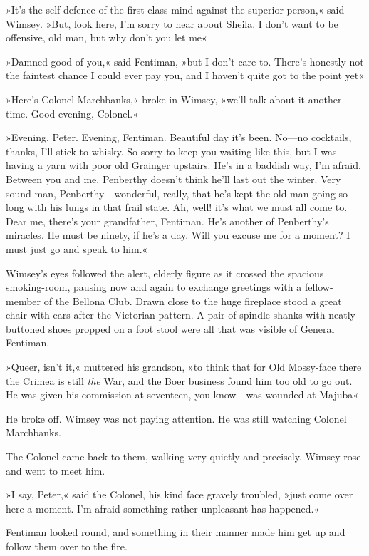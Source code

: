 »It's the self-defence of the first-class mind against the superior person,« said Wimsey. »But, look here, I'm sorry to hear about Sheila. I don't want to be offensive, old man, but why don't you let me\longdash«

»Damned good of you,« said Fentiman, »but I don't care to. There's honestly not the faintest chance I could ever pay you, and I haven't quite got to the point yet\longdash«

»Here's Colonel Marchbanks,« broke in Wimsey, »we'll talk about it another time. Good evening, Colonel.«

»Evening, Peter. Evening, Fentiman. Beautiful day it's been. No—no cocktails, thanks, I'll stick to whisky. So sorry to keep you waiting like this, but I was having a yarn with poor old Grainger upstairs. He's in a baddish way, I'm afraid. Between you and me, Penberthy doesn't think he'll last out the winter. Very sound man, Penberthy—wonderful, really, that he's kept the old man going so long with his lungs in that frail state. Ah, well! it's what we must all come to. Dear me, there's your grandfather, Fentiman. He's another of Penberthy's miracles. He must be ninety, if he's a day. Will you excuse me for a moment? I must just go and speak to him.«

Wimsey's eyes followed the alert, elderly figure as it crossed the spacious smoking-room, pausing now and again to exchange greetings with a fellow-member of the Bellona Club. Drawn close to the huge fireplace stood a great chair with ears after the Victorian pattern. A pair of spindle shanks with neatly-buttoned shoes propped on a foot stool were all that was visible of General Fentiman.

»Queer, isn't it,« muttered his grandson, »to think that for Old Mossy-face there the Crimea is still \textit{the} War, and the Boer business found him too old to go out. He was given his commission at seventeen, you know—was wounded at Majuba\longdash«

He broke off. Wimsey was not paying attention. He was still watching Colonel Marchbanks.

The Colonel came back to them, walking very quietly and precisely. Wimsey rose and went to meet him.

»I say, Peter,« said the Colonel, his kind face gravely troubled, »just come over here a moment. I'm afraid something rather unpleasant has happened.«

Fentiman looked round, and something in their manner made him get up and follow them over to the fire.

